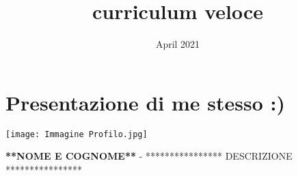 \documentclass{article}
\title{curriculum veloce}
\date{April 2021}
\begin{document}
\section*{Presentazione di me stesso :)}

\begin{minipage}{0.2\textwidth}
\texttt{[image: Immagine Profilo.jpg]}
\end{minipage}
\hfill
\begin{minipage}{0.75\textwidth}
\textbf{**NOME E COGNOME**} - 
**************** DESCRIZIONE ****************
\end{minipage}
\end{document}
